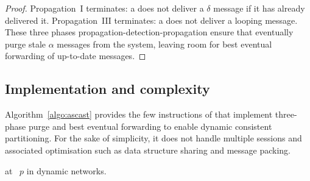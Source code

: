 \begin{proof}
  Propagation~I terminates: a \process does not deliver a $\delta$
  message if it has already delivered it. Propagation~III terminates: a
  \process does not deliver a looping message.
  These three phases propagation-detection-propagation ensure that
  \processes eventually purge stale $\alpha$ messages from the system,
  leaving room for best eventual forwarding of up-to-date messages.
\end{proof}



\subsection{Implementation and complexity}

Algorithm~\ref{algo:ascast} provides the few instructions of \NAME
that implement three-phase purge and best eventual forwarding to
enable dynamic consistent partitioning. For the sake of simplicity, it
does not handle multiple sessions and associated optimisation such as
data structure sharing and message packing.

\begin{algorithm}[h!]
  
  \caption{\label{algo:ascast}\NAME at \Process~$p$ in dynamic networks.}
\end{algorithm}

